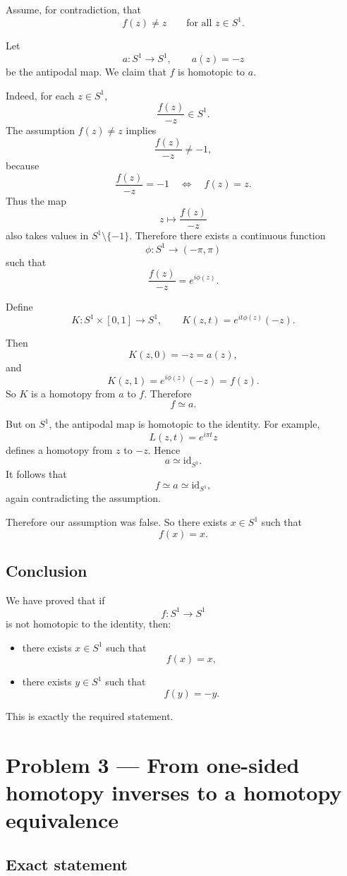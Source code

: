 \documentclass[12pt,a4paper]{article}
\theoremstyle{notespace}
\begin{document}
Assume, for contradiction, that
\[
f(z)\neq z
\qquad\text{for all }z\in S^1.
\]

Let
\[
a:S^1\to S^1,\qquad a(z)=-z
\]
be the antipodal map. We claim that \(f\) is homotopic to \(a\).

Indeed, for each \(z\in S^1\),
\[
\frac{f(z)}{-z}\in S^1.
\]
The assumption \(f(z)\neq z\) implies
\[
\frac{f(z)}{-z}\neq -1,
\]
because
\[
\frac{f(z)}{-z}=-1
\quad\Longleftrightarrow\quad
f(z)=z.
\]
Thus the map
\[
z\longmapsto \frac{f(z)}{-z}
\]
also takes values in \(S^1\setminus\{-1\}\). Therefore there exists a continuous function
\[
\phi:S^1\to (-\pi,\pi)
\]
such that
\[
\frac{f(z)}{-z}=e^{i\phi(z)}.
\]

Define
\[
K:S^1\times[0,1]\to S^1,
\qquad
K(z,t)=e^{it\phi(z)}(-z).
\]

Then
\[
K(z,0)=-z=a(z),
\]
and
\[
K(z,1)=e^{i\phi(z)}(-z)=f(z).
\]
So \(K\) is a homotopy from \(a\) to \(f\). Therefore
\[
f\simeq a.
\]

But on \(S^1\), the antipodal map is homotopic to the identity. For example,
\[
L(z,t)=e^{i\pi t}z
\]
defines a homotopy from \(z\) to \(-z\). Hence
\[
a\simeq \mathrm{id}_{S^1}.
\]
It follows that
\[
f\simeq a\simeq \mathrm{id}_{S^1},
\]
again contradicting the assumption.

Therefore our assumption was false. So there exists \(x\in S^1\) such that
\[
f(x)=x.
\]

\subsection{Conclusion}

We have proved that if
\[
f:S^1\to S^1
\]
is not homotopic to the identity, then:

\begin{itemize}
	\item there exists \(x\in S^1\) such that
	\[
	f(x)=x,
	\]
	\item there exists \(y\in S^1\) such that
	\[
	f(y)=-y.
	\]
\end{itemize}

This is exactly the required statement.

\section{Problem 3 --- From one-sided homotopy inverses to a homotopy equivalence}

\subsection{Exact statement}
\end{document}
